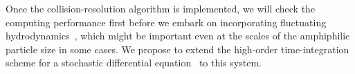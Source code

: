 Once the collision-resolution algorithm is implemented, we will check
the computing performance first before we embark on incorporating
fluctuating hydrodynamics~\cite{Bao17,Bao18}, which might be important
even at the scales of the amphiphilic particle size in some cases. We
propose to extend the high-order time-integration scheme for a
stochastic differential equation~\cite{fu2015pre} to this system.

